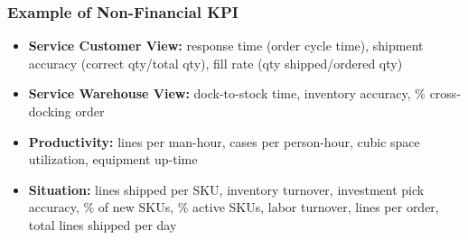 \documentclass[10pt,handout,notes=show]{beamer}
\begin{document}
\begin{frame}
  \frametitle{Example of Non-Financial KPI}

  \begin{itemize}
    \item \textbf{Service Customer View:} \alert{response time} (order cycle time), shipment accuracy (correct qty/total qty), \alert{fill rate} (qty shipped/ordered qty)
    \item \textbf{Service Warehouse View:} dock-to-stock time, \alert{inventory accuracy}, \% cross-docking order
    \item \textbf{Productivity:} \alert{lines per man-hour}, cases per person-hour, \alert{cubic space utilization}, equipment up-time
    \item \textbf{Situation:} lines shipped per SKU, \alert{inventory turnover}, investment pick accuracy, \% of new SKUs, \% active SKUs, labor turnover, lines per order, total lines shipped per day
  \end{itemize}


  \end{frame}
\end{document}
